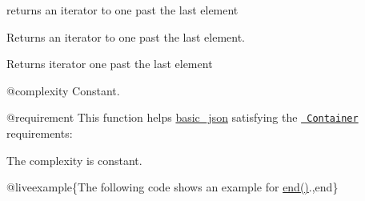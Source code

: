 returns an iterator to one past the last element 

Returns an iterator to one past the last element.

 \begin{DoxyReturn}{Returns}
iterator one past the last element
\end{DoxyReturn}
@complexity Constant.

@requirement This function helps {\ttfamily \mbox{\hyperlink{classnlohmann_1_1basic__json}{basic\+\_\+json}}} satisfying the \href{http://en.cppreference.com/w/cpp/concept/Container}{\texttt{ Container}} requirements\+:
\begin{DoxyItemize}
\item The complexity is constant.
\end{DoxyItemize}

@liveexample\{The following code shows an example for {\ttfamily \mbox{\hyperlink{classnlohmann_1_1basic__json_a13e032a02a7fd8a93fdddc2fcbc4763c}{end()}}}.,end\}

